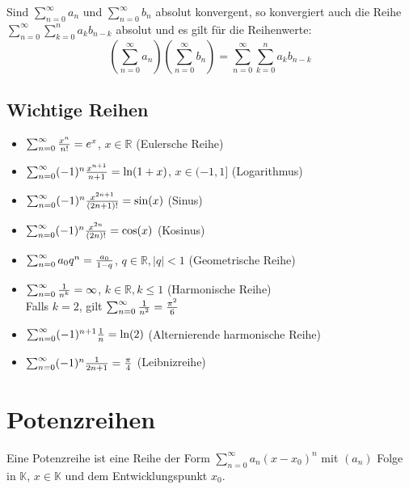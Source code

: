         Sind $ \sum _ { n = 0 } ^ { \infty } a _ n $ und $ \sum _ { n = 0 } ^ { \infty } b _ n $ absolut konvergent, so konvergiert auch die Reihe $ \sum _ { n = 0 } ^ \infty \sum _ { k = 0 } ^ n a _ k b _ { n - k } $ absolut und es gilt für die Reihenwerte:
        \begin{equation*}
            (\sum _ { n = 0 } ^ { \infty } a _ n) (\sum _ { n = 0 } ^ { \infty } b _ n) = \sum _ { n = 0 } ^ \infty \sum _ { k = 0 } ^ n a _ k b _ { n - k }
        \end{equation*}

    \section{Wichtige Reihen}
        \begin{itemize}
            \item $ \sum_{n = 0}^\infty \frac{x ^ n}{n!} = e ^ x $, $ x \in \mathbb{R} $ (Eulersche Reihe)
            \item $ \sum_{n = 0}^\infty (-1) ^ n \frac{x ^ { n + 1 }}{n + 1} = \text{ln}(1 + x) $, $ x \in (-1, 1] $ (Logarithmus)
            \item $ \sum_{n = 0}^\infty (-1) ^ n \frac{x ^ { 2n + 1 }}{(2n + 1)!} = \text{sin}(x) $ (Sinus)
            \item $ \sum_{n = 0}^\infty (-1) ^ n \frac{x ^ { 2n }}{(2n)!} = \text{cos}(x) $ (Kosinus)
            \item $ \sum_{n = 0}^\infty a _ 0 q ^ n = \frac{a _ 0}{1 - q} $, $ q \in \mathbb{R}, \lvert q \rvert < 1 $ (Geometrische Reihe)
            \item $ \sum_{n = 0}^\infty \frac{1}{n ^ k} = \infty $, $ k \in \mathbb{R}, k \leq 1 $ (Harmonische Reihe) \\ Falls $ k = 2 $, gilt $ \sum_{n = 0}^\infty \frac{1}{n ^ 2} = \frac{\pi ^ 2}{6} $
            \item $ \sum_{n = 0}^\infty (-1) ^ { n + 1 } \frac{1}{n} = \text{ln}(2) $ (Alternierende harmonische Reihe)
            \item $ \sum_{n = 0}^\infty (-1) ^ n \frac{1}{2n + 1} = \frac{\pi}{4} $ (Leibnizreihe)
        \end{itemize}

\chapter{Potenzreihen}
    Eine Potenzreihe ist eine Reihe der Form $ \sum _ { n = 0 } ^ \infty a _ n (x - x _ 0) ^ n $ mit $ (a _ n) $ Folge in $ \mathbb{K} $, $ x \in \mathbb{K} $ und dem Entwicklungspunkt $ x _ 0 $.

